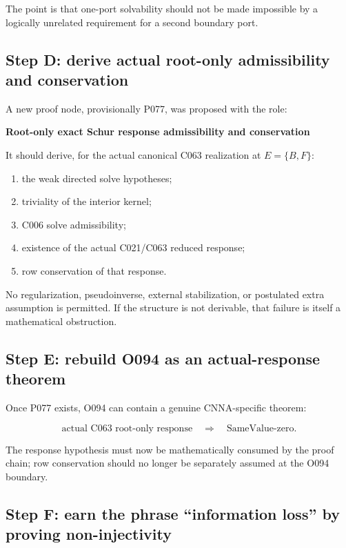 \documentclass[11pt,a4paper]{article}
\begin{document}
The point is that one-port solvability should not be made impossible by a logically unrelated requirement for a second boundary port.

\subsection{Step D: derive actual root-only admissibility and conservation}

A new proof node, provisionally P077, was proposed with the role:

\begin{center}
\textbf{Root-only exact Schur response admissibility and conservation}
\end{center}

It should derive, for the actual canonical C063 realization at $E=\{B,F\}$:

\begin{enumerate}
  \item the weak directed solve hypotheses;
  \item triviality of the interior kernel;
  \item C006 solve admissibility;
  \item existence of the actual C021/C063 reduced response;
  \item row conservation of that response.
\end{enumerate}

No regularization, pseudoinverse, external stabilization, or postulated extra assumption is permitted. If the structure is not derivable, that failure is itself a mathematical obstruction.

\subsection{Step E: rebuild O094 as an actual-response theorem}

Once P077 exists, O094 can contain a genuine CNNA-specific theorem:

\[
\text{actual C063 root-only response}
\quad\Longrightarrow\quad
\text{SameValue-zero}.
\]

The response hypothesis must now be mathematically consumed by the proof chain; row conservation should no longer be separately assumed at the O094 boundary.

\subsection{Step F: earn the phrase ``information loss'' by proving non-injectivity}
\end{document}
